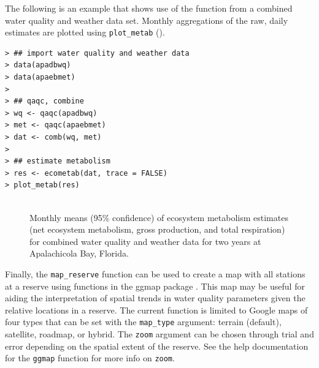\documentclass[10pt,letterpaper]{article}\usepackage[]{graphicx}\usepackage[]{color}
\makeatletter
\newenvironment{kframe}{%
 \def\at@end@of@kframe{}%
 \ifinner\ifhmode%
  \def\at@end@of@kframe{\end{minipage}}%
  \begin{minipage}{\columnwidth}%
 \fi\fi%
 \def\FrameCommand##1{\hskip\@totalleftmargin \hskip-\fboxsep
 \colorbox{shadecolor}{##1}\hskip-\fboxsep
     \hskip-\linewidth \hskip-\@totalleftmargin \hskip\columnwidth}%
 \MakeFramed {\advance\hsize-\width
   \@totalleftmargin\z@ \linewidth\hsize
   \@setminipage}}%
 {\par\unskip\endMakeFramed%
 \at@end@of@kframe}
\newenvironment{knitrout}{}{} %
\makeatother
\begin{document}
The following is an example that shows use of the function from a combined water quality and weather data set.  Monthly aggregations of the raw, daily estimates are plotted using \texttt{plot\_metab} ().

\begin{knitrout}\small
{}\color{fgcolor}\begin{kframe}
\begin{verbatim}
> ## import water quality and weather data
> data(apadbwq)
> data(apaebmet)
> 
> ## qaqc, combine
> wq <- qaqc(apadbwq)
> met <- qaqc(apaebmet)
> dat <- comb(wq, met)
> 
> ## estimate metabolism
> res <- ecometab(dat, trace = FALSE)
> plot_metab(res)
\end{verbatim}
\end{kframe}\begin{figure}[!h]

{\centering \includegraphics[width=0.00\textwidth]{figure/metab_ex-1} 

}

\caption[Monthly means (95\% confidence) of ecosystem metabolism estimates (net ecosystem metabolism, gross production, and total respiration) for combined water quality and weather data for two years at Apalachicola Bay, Florida]{Monthly means (95\% confidence) of ecosystem metabolism estimates (net ecosystem metabolism, gross production, and total respiration) for combined water quality and weather data for two years at Apalachicola Bay, Florida.}\label{fig:metab_ex}
\end{figure}


\end{knitrout}

Finally, the \texttt{map\_reserve} function can be used to create a map with all stations at a reserve using functions in the ggmap package \cite{Kahle13}. This map may be useful for aiding the interpretation of spatial trends in water quality parameters given the relative locations in a reserve.  The current function is limited to Google maps of four types that can be set with the \texttt{map\_type} argument: terrain (default), satellite, roadmap, or hybrid.  The \texttt{zoom} argument can be chosen through trial and error depending on the spatial extent of the reserve.  See the help documentation for the \texttt{ggmap} function for more info on \texttt{zoom}.
\end{document}
